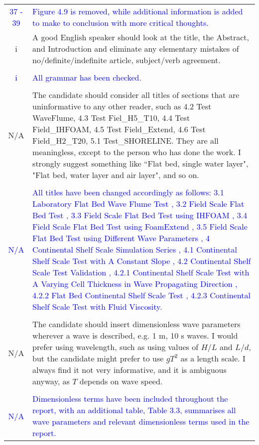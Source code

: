 \documentclass[12pt]{article}
\begin{document}
\begin{center}
\begin{tabularx}{\linewidth}{ c | X }
    \textcolor{blue}{37 - 39} & \textcolor{blue}{Figure 4.9 is removed, while additional information is added to make to conclusion with more critical thoughts.}\\    
       i & A good English speaker should look at the title, the Abstract, and Introduction and eliminate any
    elementary mistakes of no/definite/indefinite article, subject/verb agreement.\\
    & \\
       \textcolor{blue}{i} & \textcolor{blue}{All grammar has been checked.} \\
       & \\
    \hline

    N/A & The candidate should consider all titles of sections that are uninformative to any other reader, such as 4.2 Test WaveFlume, 4.3 Test Fiel\_H5\_T10, 4.4 Test Field\_IHFOAM, 4.5 Test Field\_Extend, 4.6
    Test Field\_H2\_T20, 5.1 Test\_SHORELINE. They are all meaningless, except to the person who has
    done the work. I strongly suggest something like “Flat bed, single water layer", "Flat bed, water
    layer and air layer", and so on.   \\
    & \\
     \textcolor{blue}{N/A} & \textcolor{blue}{All titles have been changed accordingly as follows:
    3.1 Laboratory Flat Bed Wave Flume Test , 
    3.2 Field Scale Flat Bed Test ,
    3.3 Field Scale Flat Bed Test using IHFOAM ,
    3.4 Field Scale Flat Bed Test using FoamExtend ,
    3.5 Field Scale Flat Bed Test using Different Wave Parameters , 
    4 Continental Shelf Scale Simulation Series ,
    4.1 Continental Shelf Scale Test with A Constant Slope , 
    4.2 Continental Shelf Scale Test Validation  ,
    4.2.1
    Continental Shelf Scale Test with A Varying Cell Thickness in Wave Propagating
    Direction ,
    4.2.2 Flat Bed Continental Shelf Scale Test ,
    4.2.3 Continental Shelf Scale Test with Fluid Viscosity.} \\
    & \\   
    \hline    
      N/A & The candidate should insert dimensionless wave parameters wherever a wave is described, e.g. 1
    m, 10 s waves. I would prefer using wavelength, such as using values of $H/L$ and $L/d$, but the
    candidate might prefer to use $gT^2$ as a length scale. I always find it not very informative, and it is
    ambiguous anyway, as $T$ depends on wave speed.  \\
    & \\
    \textcolor{blue}{N/A} & \textcolor{blue}{Dimensionless terms have been included throughout the report, with an additional table, Table 3.3, summarises all wave parameters and relevant dimensionless terms used in the report.}\\ 

\end{tabularx}
\end{center}
\end{document}
